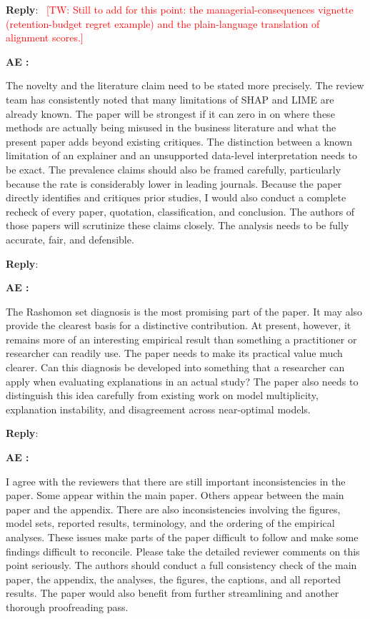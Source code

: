 \documentclass[11pt]{article}
\newcommand{\tw}[1]{\textcolor{red}{[TW: #1]}}
\newcounter{se}[section]
\newcounter{aed}[section]
\newenvironment{aed}[1][]{%
    \refstepcounter{aed}\par\medskip\noindent%
    \textbf{AE \theaed: #1}\rmfamily\itshape%
}{\medskip}
\newcounter{reviewer}
\newcounter{point}[reviewer]
\newenvironment{reply}
 {\par\medskip \noindent \begin{sf}\textbf{Reply}:\ }
 {\medskip \end{sf}}
\begin{document}
\begin{reply}
{\tw{Still to add for this point: the managerial-consequences vignette (retention-budget regret example) and the plain-language translation of alignment scores.}
}
\end{reply}


\begin{aed}
The novelty and the literature claim need to be stated more precisely. The review team has consistently noted that many limitations of SHAP and LIME are already known. The paper will be strongest if it can zero in on where these methods are actually being misused in the business literature and what the present paper adds beyond existing critiques. The distinction between a known limitation of an explainer and an unsupported data-level interpretation needs to be exact. The prevalence claims should also be framed carefully, particularly because the rate is considerably lower in leading journals. Because the paper directly identifies and critiques prior studies, I would also conduct a complete recheck of every paper, quotation, classification, and conclusion. The authors of those papers will scrutinize these claims closely. The analysis needs to be fully accurate, fair, and defensible.
\end{aed}

\begin{reply}

\end{reply}


\begin{aed}
The Rashomon set diagnosis is the most promising part of the paper. It may also provide the clearest basis for a distinctive contribution. At present, however, it remains more of an interesting empirical result than something a practitioner or researcher can readily use. The paper needs to make its practical value much clearer. Can this diagnosis be developed into something that a researcher can apply when evaluating explanations in an actual study? The paper also needs to distinguish this idea carefully from existing work on model multiplicity, explanation instability, and disagreement across near-optimal models.
\end{aed}

\begin{reply}

\end{reply}


\begin{aed}
I agree with the reviewers that there are still important inconsistencies in the paper. Some appear within the main paper. Others appear between the main paper and the appendix. There are also inconsistencies involving the figures, model sets, reported results, terminology, and the ordering of the empirical analyses. These issues make parts of the paper difficult to follow and make some findings difficult to reconcile. Please take the detailed reviewer comments on this point seriously. The authors should conduct a full consistency check of the main paper, the appendix, the analyses, the figures, the captions, and all reported results. The paper would also benefit from further streamlining and another thorough proofreading pass.
\end{aed}
\end{document}
